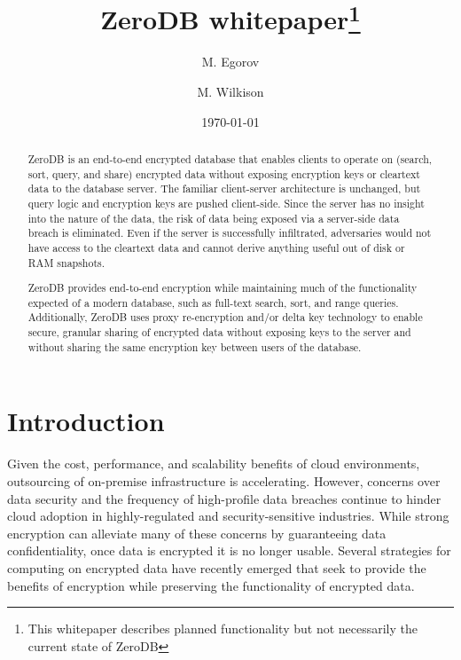 \documentclass[notitlepage,longbibliography]{revtex4-1}
\begin{document}
\title{ZeroDB whitepaper\footnote{This whitepaper describes planned functionality but not necessarily the current state of ZeroDB}}

\author{M. Egorov}
\author{M. Wilkison}

\begin{abstract}
ZeroDB is an end-to-end encrypted database that enables clients to operate on (search, sort, query, and share) encrypted data without exposing encryption keys or cleartext data to the database server.
The familiar client-server architecture is unchanged, but query logic and encryption keys are pushed client-side.
Since the server has no insight into the nature of the data, the risk of data being exposed via a server-side data breach is eliminated.
Even if the server is successfully infiltrated, adversaries would not have access to the cleartext data and
cannot derive anything useful out of disk or RAM snapshots.

ZeroDB provides end-to-end encryption while maintaining much of the functionality expected of a modern database, such as full-text search, sort, and range queries.
Additionally, ZeroDB uses proxy re-encryption and/or delta key technology to enable secure, granular sharing of encrypted data without exposing keys to the server and without sharing the same encryption key between users of the database.
\end{abstract}

\date{\today}
\maketitle

\section{Introduction}

Given the cost, performance, and scalability benefits of cloud environments, outsourcing of on-premise infrastructure is accelerating.
However, concerns over data security and the frequency of high-profile data breaches continue to hinder cloud adoption in highly-regulated and security-sensitive industries.
While strong encryption can alleviate many of these concerns by guaranteeing data confidentiality, once data is encrypted it is no longer usable.
Several strategies for computing on encrypted data have recently emerged that seek to provide the benefits of encryption while preserving the functionality of encrypted data.
\end{document}
